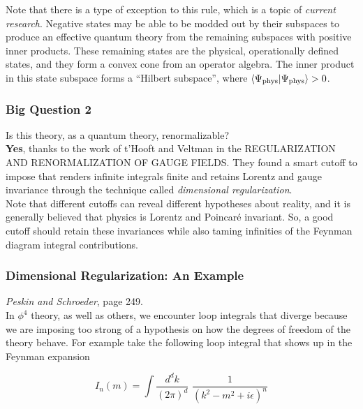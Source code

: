 \documentclass[10pt]{article}
\begin{document}
\noindent Note that there is a type of exception to this rule, which is a topic of \textit{current research}. Negative states may be able to be modded out by their subspaces to produce an effective quantum theory from the remaining subspaces with positive inner products. These remaining states are the physical, operationally defined states, and they form a convex cone from an operator algebra. The inner product in this state subspace forms a ``Hilbert subspace'', where $\braket{\Psi_{\text{phys}} | \Psi_{\text{phys}}} > 0$. \\

\subsubsection*{Big Question 2}

\noindent Is this theory, as a quantum theory, renormalizable? \\

\noindent \textbf{Yes}, thanks to the work of t'Hooft and Veltman in the REGULARIZATION AND RENORMALIZATION OF GAUGE FIELDS. They found a smart cutoff to impose that renders infinite integrals finite and retains Lorentz and gauge invariance through the technique called \textit{dimensional regularization}.\\

\noindent Note that different cutoffs can reveal different hypotheses about reality, and it is generally believed that physics is Lorentz and Poincar\'e invariant. So, a good cutoff should retain these invariances while also taming infinities of the Feynman diagram integral contributions. \\

\subsubsection*{Dimensional Regularization: An Example}

\textit{Peskin and Schroeder}, page 249. \\

\noindent In $\phi^4$ theory, as well as others, we encounter loop integrals that diverge because we are imposing too strong of a hypothesis on how the degrees of freedom of the theory behave. For example take the following loop integral that shows up in the Feynman expansion

\begin{equation}
I_n(m) = \int \frac{d^d k}{(2\pi)^d} \,\, \frac{1}{(k^2 - m^2 + i \epsilon)^n}
\end{equation}
\end{document}

